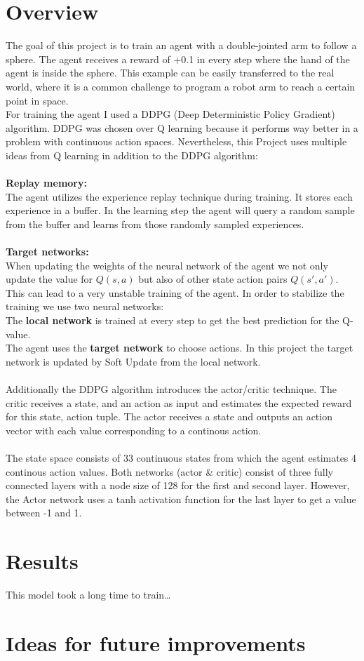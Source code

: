 \documentclass[12pt,a4paper]{article}
\begin{document}
    \section{Overview}\label{sec:overview}
    The goal of this project is to train an agent with a double-jointed arm to follow a sphere.
    The agent receives a reward of +0.1 in every step where the hand of the agent is inside the sphere.
    This example can be easily transferred to the real world, where it is a common challenge to program a robot arm to reach a certain point in space.
    \\
    For training the agent I used a DDPG (Deep Deterministic Policy Gradient) algorithm.
    DDPG was chosen over Q learning because it performs way better in a problem with continuous action spaces.
    Nevertheless, this Project uses multiple ideas from Q learning in addition to the DDPG algorithm:
    \\\\
    \textbf{Replay memory:}\\
    The agent utilizes the experience replay technique during training.
    It stores each experience in a buffer.
    In the learning step the agent will query a random sample from the buffer and learns from those randomly sampled experiences.
    \\\\
    \textbf{Target networks:}\\
    When updating the weights of the neural network of the agent we not only update the value for $Q(s,a)$ but also of other state action pairs $Q(s',a')$.
    This can lead to a very unstable training of the agent.
    In order to stabilize the training we use two neural networks: \\
    The \textbf{local network} is trained at every step to get the best prediction for the Q-value.\\
    The agent uses the \textbf{target network} to choose actions.
    In this project the target network is updated by Soft Update from the local network.
    \\\\
    Additionally the DDPG algorithm introduces the actor/critic technique.
    The critic receives a state, and an action as input and estimates the expected reward for this state, action tuple.
    The actor receives a state and outputs an action vector with each value corresponding to a continous action.
    \\\\
    The state space consists of 33 continuous states from which the agent estimates 4 continous action values.
    Both networks (actor \& critic) consist of three fully connected layers with a node size of 128 for the first and second layer.
    However, the Actor network uses a tanh activation function for the last layer to get a value between -1 and 1.


    \section{Results}\label{sec:results}
    This model took a long time to train\ldots


    \section{Ideas for future improvements}\label{sec:ideas}
\end{document}
